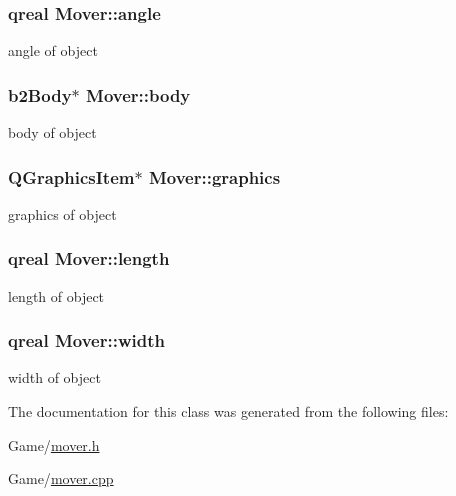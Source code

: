 \subsubsection[{\texorpdfstring{angle}{angle}}]{\setlength{\rightskip}{0pt plus 5cm}qreal Mover\+::angle}\hypertarget{class_mover_acb7d779b2ce97a86149990dce48e88b5}{}\label{class_mover_acb7d779b2ce97a86149990dce48e88b5}


angle of object 

\subsubsection[{\texorpdfstring{body}{body}}]{\setlength{\rightskip}{0pt plus 5cm}b2\+Body$\ast$ Mover\+::body}\hypertarget{class_mover_a6e91384098180f0fef918dd45f97f201}{}\label{class_mover_a6e91384098180f0fef918dd45f97f201}


body of object 

\subsubsection[{\texorpdfstring{graphics}{graphics}}]{\setlength{\rightskip}{0pt plus 5cm}Q\+Graphics\+Item$\ast$ Mover\+::graphics}\hypertarget{class_mover_a111eebc06a95c11dc6f48dcc6a33478f}{}\label{class_mover_a111eebc06a95c11dc6f48dcc6a33478f}


graphics of object 

\subsubsection[{\texorpdfstring{length}{length}}]{\setlength{\rightskip}{0pt plus 5cm}qreal Mover\+::length}\hypertarget{class_mover_a2c55f3d5a807d328bcc8c73cdef5dda2}{}\label{class_mover_a2c55f3d5a807d328bcc8c73cdef5dda2}


length of object 

\subsubsection[{\texorpdfstring{width}{width}}]{\setlength{\rightskip}{0pt plus 5cm}qreal Mover\+::width}\hypertarget{class_mover_ab78fbf587764d7cdcd417d2a444408d4}{}\label{class_mover_ab78fbf587764d7cdcd417d2a444408d4}


width of object 



The documentation for this class was generated from the following files\+:\begin{DoxyCompactItemize}
\item 
Game/\hyperlink{mover_8h}{mover.\+h}\item 
Game/\hyperlink{mover_8cpp}{mover.\+cpp}\end{DoxyCompactItemize}
